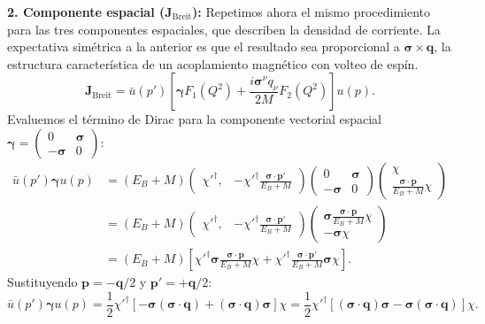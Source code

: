 \documentclass[10pt,a4paper]{article}
\begin{document}
\textbf{2. Componente espacial ($\mathbf{J}_{\text{Breit}}$):}
Repetimos ahora el mismo procedimiento para las tres componentes espaciales, que describen la densidad de corriente. La expectativa simétrica a la anterior es que el resultado sea proporcional a $\boldsymbol{\sigma}\times\mathbf{q}$, la estructura característica de un acoplamiento magnético con volteo de espín.
\begin{equation}
\mathbf{J}_{\text{Breit}} = \bar{u}(p') \left[ \boldsymbol{\gamma} F_1(Q^2) + \frac{i \boldsymbol{\sigma}^\nu q_\nu}{2M} F_2(Q^2) \right] u(p).
\end{equation}
Evaluemos el término de Dirac para la componente vectorial espacial $\boldsymbol{\gamma} = \begin{pmatrix} 0 & \boldsymbol{\sigma} \\ -\boldsymbol{\sigma} & 0 \end{pmatrix}$:
\begin{align}
\bar{u}(p') \boldsymbol{\gamma} u(p) &= (E_B + M) \begin{pmatrix} \chi'^\dagger, & -\chi'^\dagger \frac{\boldsymbol{\sigma} \cdot \mathbf{p}'}{E_B + M} \end{pmatrix} \begin{pmatrix} 0 & \boldsymbol{\sigma} \\ -\boldsymbol{\sigma} & 0 \end{pmatrix} \begin{pmatrix} \chi \\ \frac{\boldsymbol{\sigma} \cdot \mathbf{p}}{E_B + M} \chi \end{pmatrix} \nonumber \\
&= (E_B + M) \begin{pmatrix} \chi'^\dagger, & -\chi'^\dagger \frac{\boldsymbol{\sigma} \cdot \mathbf{p}'}{E_B + M} \end{pmatrix} \begin{pmatrix} \boldsymbol{\sigma} \frac{\boldsymbol{\sigma} \cdot \mathbf{p}}{E_B + M} \chi \\ -\boldsymbol{\sigma} \chi \end{pmatrix} \nonumber \\
&= (E_B + M) \left[ \chi'^\dagger \boldsymbol{\sigma} \frac{\boldsymbol{\sigma} \cdot \mathbf{p}}{E_B + M} \chi + \chi'^\dagger \frac{\boldsymbol{\sigma} \cdot \mathbf{p}'}{E_B + M} \boldsymbol{\sigma} \chi \right].
\end{align}
Sustituyendo $\mathbf{p} = -\mathbf{q}/2$ y $\mathbf{p}' = +\mathbf{q}/2$:
\begin{equation}
\bar{u}(p') \boldsymbol{\gamma} u(p) = \frac{1}{2} \chi'^\dagger \left[ -\boldsymbol{\sigma}(\boldsymbol{\sigma} \cdot \mathbf{q}) + (\boldsymbol{\sigma} \cdot \mathbf{q})\boldsymbol{\sigma} \right] \chi = \frac{1}{2} \chi'^\dagger \left[ (\boldsymbol{\sigma} \cdot \mathbf{q})\boldsymbol{\sigma} - \boldsymbol{\sigma}(\boldsymbol{\sigma} \cdot \mathbf{q}) \right] \chi.
\end{equation}
\end{document}
